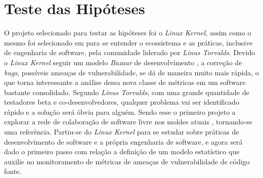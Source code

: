 \section{Teste das Hipóteses}\label{metodologia:testehipoteses}

O projeto selecionado para testar as hipóteses foi o \textit{Linux Kernel},
assim como o mesmo foi selecionado em  para se
entender o ecossistema e as práticas, inclusive de engenharia de software, pela
comunidade liderado por \textit{Linus Torvalds}. Devido o \textit{Linux Kernel}
seguir um modelo \textit{Bazaar} de desenvolvimento
\cite{cathedral_bazaar:1997}, a correção de \textit{bugs}, possíveis ameaças de
vulnerabilidade, se dá de maneira muito mais rápida, o que torna interessante a
análise dessa nova classe de métricas em um software bastante consolidado.
Segundo \textit{Linus Torvalds}, com uma grande quantidade de testadores beta e
co-desenvolvedores, qualquer problema vai ser identificado rápido e a solução
será óbvia para alguém. Sendo esse o primeiro projeto a explorar a rede de
colaboração de software livre nos moldes atuais \cite{cathedral_bazaar:1997},
tornando-se uma referência.  Partiu-se do \textit{Linux Kernel} para se estudar
sobre práticas de desenvolvimento de software e a própria engenharia de
software, e agora será dado o primeiro passo com relação a definição de um
modelo estatístico que auxilie no monitoramento de métricas de ameaças de
vulnerabilidade de código fonte.

